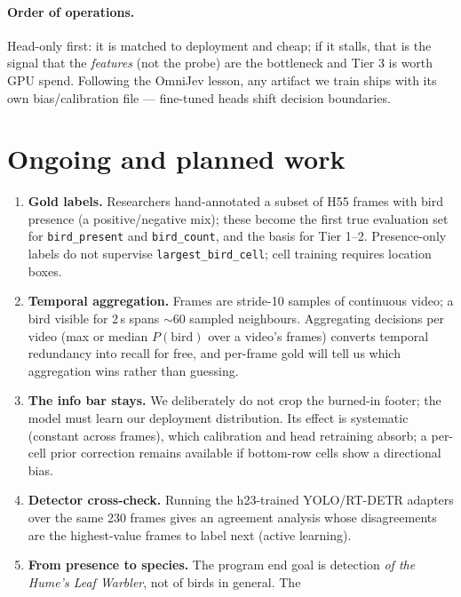 \documentclass[11pt]{article}
\newcommand{\code}[1]{\texttt{#1}}
\begin{document}
\paragraph{Order of operations.} Head-only first: it is matched to deployment
and cheap; if it stalls, that is the signal that the \emph{features} (not the
probe) are the bottleneck and Tier 3 is worth GPU spend. Following the OmniJev
lesson, any artifact we train ships with its own bias/calibration file ---
fine-tuned heads shift decision boundaries.

\section{Ongoing and planned work}
\label{sec:roadmap}

\begin{enumerate}
  \item \textbf{Gold labels.} Researchers hand-annotated a subset of H55
        frames with bird presence (a positive/negative mix); these become the
        first true evaluation set for \code{bird\_present} and
        \code{bird\_count}, and the basis for Tier 1--2. Presence-only labels
        do not supervise \code{largest\_bird\_cell}; cell training requires
        location boxes.
  \item \textbf{Temporal aggregation.} Frames are stride-10 samples of
        continuous video; a bird visible for 2\,s spans $\sim$60 sampled
        neighbours. Aggregating decisions per video (max or median
        $P(\text{bird})$ over a video's frames) converts temporal redundancy
        into recall for free, and per-frame gold will tell us which
        aggregation wins rather than guessing.
  \item \textbf{The info bar stays.} We deliberately do not crop the
        burned-in footer; the model must learn our deployment distribution.
        Its effect is systematic (constant across frames), which calibration
        and head retraining absorb; a per-cell prior correction remains
        available if bottom-row cells show a directional bias.
  \item \textbf{Detector cross-check.} Running the h23-trained YOLO/RT-DETR
        adapters over the same 230 frames gives an agreement analysis whose
        disagreements are the highest-value frames to label next (active
        learning).
  \item \textbf{From presence to species.} The program end goal is detection
        \emph{of the Hume's Leaf Warbler}, not of birds in general. The

\end{enumerate}
\end{document}
